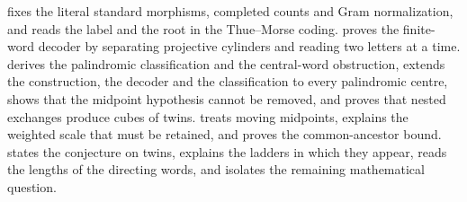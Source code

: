  fixes the literal standard morphisms,
completed counts and Gram normalization, and reads the label and the root in the
Thue--Morse coding.  proves the finite-word decoder by separating
projective cylinders and reading two letters at a time.  derives
the palindromic classification and the central-word obstruction, extends the
construction, the decoder and the classification to every palindromic centre, shows
that the midpoint hypothesis cannot be removed, and proves that nested exchanges
produce cubes of twins.  treats moving midpoints, explains the
weighted scale that must be retained, and proves the common-ancestor bound.
 states the conjecture on twins, explains the ladders in which
they appear, reads the lengths of the directing words, and isolates the remaining
mathematical question.
